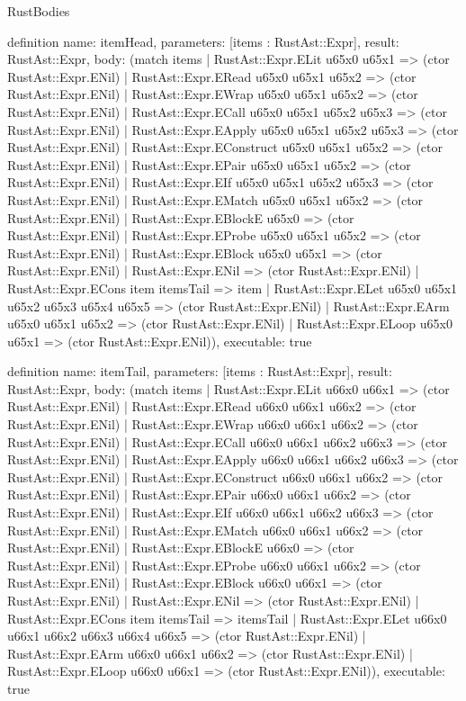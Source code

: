 \begin{lexlean}{RustBodies}
\begin{semanticmodule}
definition{
  name: itemHead,
  parameters: [items : RustAst::Expr],
  result: RustAst::Expr,
  body: (match items
    | RustAst::Expr.ELit u65x0 u65x1 => (ctor RustAst::Expr.ENil)
    | RustAst::Expr.ERead u65x0 u65x1 u65x2 => (ctor RustAst::Expr.ENil)
    | RustAst::Expr.EWrap u65x0 u65x1 u65x2 => (ctor RustAst::Expr.ENil)
    | RustAst::Expr.ECall u65x0 u65x1 u65x2 u65x3 => (ctor RustAst::Expr.ENil)
    | RustAst::Expr.EApply u65x0 u65x1 u65x2 u65x3 => (ctor RustAst::Expr.ENil)
    | RustAst::Expr.EConstruct u65x0 u65x1 u65x2 => (ctor RustAst::Expr.ENil)
    | RustAst::Expr.EPair u65x0 u65x1 u65x2 => (ctor RustAst::Expr.ENil)
    | RustAst::Expr.EIf u65x0 u65x1 u65x2 u65x3 => (ctor RustAst::Expr.ENil)
    | RustAst::Expr.EMatch u65x0 u65x1 u65x2 => (ctor RustAst::Expr.ENil)
    | RustAst::Expr.EBlockE u65x0 => (ctor RustAst::Expr.ENil)
    | RustAst::Expr.EProbe u65x0 u65x1 u65x2 => (ctor RustAst::Expr.ENil)
    | RustAst::Expr.EBlock u65x0 u65x1 => (ctor RustAst::Expr.ENil)
    | RustAst::Expr.ENil => (ctor RustAst::Expr.ENil)
    | RustAst::Expr.ECons item itemsTail => item
    | RustAst::Expr.ELet u65x0 u65x1 u65x2 u65x3 u65x4 u65x5 => (ctor RustAst::Expr.ENil)
    | RustAst::Expr.EArm u65x0 u65x1 u65x2 => (ctor RustAst::Expr.ENil)
    | RustAst::Expr.ELoop u65x0 u65x1 => (ctor RustAst::Expr.ENil)),
  executable: true
}

definition{
  name: itemTail,
  parameters: [items : RustAst::Expr],
  result: RustAst::Expr,
  body: (match items
    | RustAst::Expr.ELit u66x0 u66x1 => (ctor RustAst::Expr.ENil)
    | RustAst::Expr.ERead u66x0 u66x1 u66x2 => (ctor RustAst::Expr.ENil)
    | RustAst::Expr.EWrap u66x0 u66x1 u66x2 => (ctor RustAst::Expr.ENil)
    | RustAst::Expr.ECall u66x0 u66x1 u66x2 u66x3 => (ctor RustAst::Expr.ENil)
    | RustAst::Expr.EApply u66x0 u66x1 u66x2 u66x3 => (ctor RustAst::Expr.ENil)
    | RustAst::Expr.EConstruct u66x0 u66x1 u66x2 => (ctor RustAst::Expr.ENil)
    | RustAst::Expr.EPair u66x0 u66x1 u66x2 => (ctor RustAst::Expr.ENil)
    | RustAst::Expr.EIf u66x0 u66x1 u66x2 u66x3 => (ctor RustAst::Expr.ENil)
    | RustAst::Expr.EMatch u66x0 u66x1 u66x2 => (ctor RustAst::Expr.ENil)
    | RustAst::Expr.EBlockE u66x0 => (ctor RustAst::Expr.ENil)
    | RustAst::Expr.EProbe u66x0 u66x1 u66x2 => (ctor RustAst::Expr.ENil)
    | RustAst::Expr.EBlock u66x0 u66x1 => (ctor RustAst::Expr.ENil)
    | RustAst::Expr.ENil => (ctor RustAst::Expr.ENil)
    | RustAst::Expr.ECons item itemsTail => itemsTail
    | RustAst::Expr.ELet u66x0 u66x1 u66x2 u66x3 u66x4 u66x5 => (ctor RustAst::Expr.ENil)
    | RustAst::Expr.EArm u66x0 u66x1 u66x2 => (ctor RustAst::Expr.ENil)
    | RustAst::Expr.ELoop u66x0 u66x1 => (ctor RustAst::Expr.ENil)),
  executable: true
}


\end{semanticmodule}
\end{lexlean}
